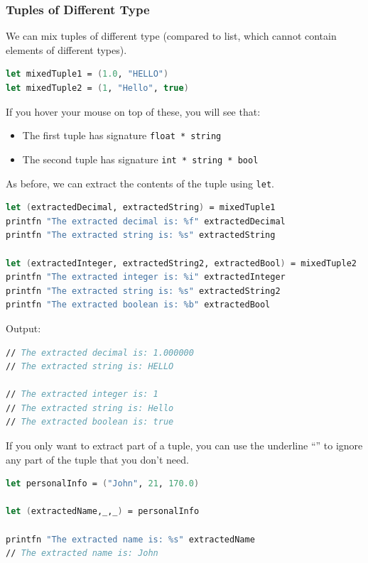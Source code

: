\documentclass[12pt]{article}
\begin{document}
\subsubsection*{Tuples of Different Type}
We can mix tuples of different type (compared to list, which cannot contain elements of different types).
\begin{lstlisting}[language=FSharp]
let mixedTuple1 = (1.0, "HELLO")
let mixedTuple2 = (1, "Hello", true)
\end{lstlisting}
If you hover your mouse on top of these, you will see that:
\begin{itemize}
\item The first tuple has signature \texttt{float * string}
\item The second tuple has signature \texttt{int * string * bool}
\end{itemize}
As before, we can extract the contents of the tuple using \texttt{let}.
\begin{lstlisting}[language=FSharp]
let (extractedDecimal, extractedString) = mixedTuple1
printfn "The extracted decimal is: %f" extractedDecimal
printfn "The extracted string is: %s" extractedString

let (extractedInteger, extractedString2, extractedBool) = mixedTuple2
printfn "The extracted integer is: %i" extractedInteger
printfn "The extracted string is: %s" extractedString2
printfn "The extracted boolean is: %b" extractedBool
\end{lstlisting}
Output:
\begin{lstlisting}[language=FSharp]
// The extracted decimal is: 1.000000
// The extracted string is: HELLO

// The extracted integer is: 1
// The extracted string is: Hello
// The extracted boolean is: true
\end{lstlisting}
If you only want to extract part of a tuple, you can use the underline ``\underline{\:\:}'' to ignore any part of the tuple that you don't need.
\begin{lstlisting}[language=FSharp]
let personalInfo = ("John", 21, 170.0)

let (extractedName,_,_) = personalInfo

printfn "The extracted name is: %s" extractedName
// The extracted name is: John
\end{lstlisting}

\pagebreak
\end{document}
